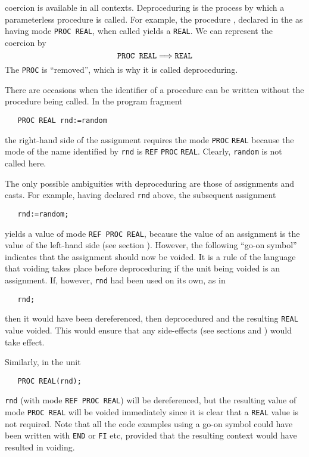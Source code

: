  coercion is available in all
contexts.  Deproceduring is the process by which a parameterless
procedure is called.  For example, the procedure ,
declared in the  as having mode
\verb|PROC REAL|, when called yields a \verb|REAL|.  We can represent
the coercion by
$$\hbox{\verb|PROC REAL|\co\verb|REAL|}$$
The \verb|PROC| is ``removed'', which is why it is called
deproceduring.

There are occasions when the identifier of a procedure can be written
without the procedure being called. In the program fragment
\begin{verbatim}
   PROC REAL rnd:=random
\end{verbatim}
\noindent
the right-hand side of the assignment requires the mode \verb|PROC|
\verb|REAL| because the mode of the name identified by \verb|rnd| is
\verb|REF| \verb|PROC| \verb|REAL|.  Clearly, \verb|random| is not
called here.

The only possible ambiguities with deproceduring are those of
assignments and casts. For example, having declared \verb|rnd| above,
the subsequent assignment
\begin{verbatim}
   rnd:=random;
\end{verbatim}
\noindent
yields a value of mode \verb|REF PROC REAL|, because the value of an
assignment is the value of the left-hand side (see section
). However, the following ``go-on symbol'' indicates
that the assignment should now be voided. It is a rule of the
language that voiding takes place before deproceduring if the unit
being voided is an assignment. If, however, \verb|rnd| had been used
on its own, as in
\begin{verbatim}
   rnd;
\end{verbatim}
\noindent
then it would have been dereferenced, then deprocedured and the
resulting \verb|REAL| value voided. This would ensure that any
side-effects (see sections  and )
would take effect.

Similarly, in the unit
\begin{verbatim}
   PROC REAL(rnd);
\end{verbatim}
\noindent
\verb|rnd| (with mode \verb|REF PROC REAL|) will be dereferenced, but
the resulting value of mode \verb|PROC REAL| will be voided
immediately since it is clear that a \verb|REAL| value is not
required. Note that all the code examples using a go-on symbol could
have been written with \verb|END| or \verb|FI| etc, provided that the
resulting context would have resulted in voiding.

